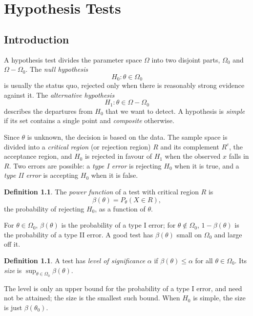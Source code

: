 \documentclass[12pt,a4paper]{report}
\theoremstyle{definition}
\newtheorem{defn}[thm]{Definition}
\begin{document}
\chapter{Hypothesis Tests}

\section{Introduction}

A hypothesis test divides the parameter space $\Omega$ into two disjoint parts,
$\Omega_0$ and $\Omega - \Omega_0$. The \emph{null hypothesis}
\[H_0\colon\theta\in\Omega_0\]
is usually the status quo, rejected only when there is reasonably strong evidence
against it. The \emph{alternative hypothesis}
\[H_1\colon\theta\in\Omega - \Omega_0\]
describes the departures from $H_0$ that we want to detect. A hypothesis is
\emph{simple} if its set contains a single point and \emph{composite} otherwise.

Since $\theta$ is unknown, the decision is based on the data. The sample space is
divided into a \emph{critical region} (or rejection region) $R$ and its complement
$R^c$, the acceptance region, and $H_0$ is rejected in favour of $H_1$ when the
observed $x$ falls in $R$. Two errors are possible: a \emph{type I error} is
rejecting $H_0$ when it is true, and a \emph{type II error} is accepting $H_0$ when
it is false.

\begin{defn}
\label{def:powerfunction}
The \emph{power function} of a test with critical region $R$ is
\[\beta(\theta) = P_\theta(X\in R),\]
the probability of rejecting $H_0$, as a function of $\theta$.
\end{defn}

For $\theta\in\Omega_0$, $\beta(\theta)$ is the probability of a type I error; for
$\theta\notin\Omega_0$, $1 - \beta(\theta)$ is the probability of a type II error. A good
test has $\beta(\theta)$ small on $\Omega_0$ and large off it.

\begin{defn}
\label{def:levelsize}
A test has \emph{level of significance} $\alpha$ if $\beta(\theta)\le\alpha$ for all
$\theta\in\Omega_0$. Its \emph{size} is $\sup_{\theta\in\Omega_0}\beta(\theta)$.
\end{defn}

The level is only an upper bound for the probability of a type I error, and need
not be attained; the size is the smallest such bound. When $H_0$ is simple, the size
is just $\beta(\theta_0)$.
\end{document}
